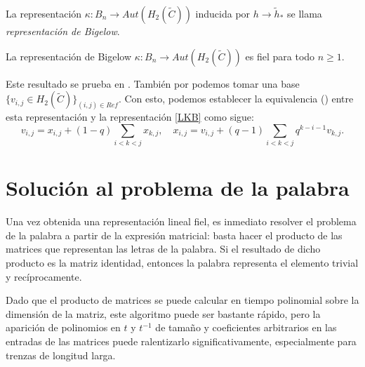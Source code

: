 \documentclass[TFG.tex]{subfiles}
\begin{document}
\begin{defi}
La representación $\kappa:B_n\to Aut(H_2(\widetilde{C}))$ inducida por $h\to\tilde{h}_*$ se llama \emph{representación de Bigelow}.
\end{defi}

\begin{teorema}
La representación de Bigelow $\kappa:B_n\to Aut(H_2(\widetilde{C}))$ es fiel para todo $n\geq 1$.
\end{teorema}

Este resultado se prueba en \cite{Bil}. También por \cite{Bil} podemos tomar una base $\{v_{i,j}\in H_2(\widetilde{C})\}_{(i,j)\in Ref}$. Con esto, podemos establecer la equivalencia (\cite{nundam}) entre esta representación y la representación  \ref{LKB} como sigue:
\[
v_{i,j}=x_{i,j}+(1-q)\sum_{i<k<j}x_{k,j},\quad x_{i,j}=v_{i,j}+(q-1)\sum_{i<k<j}q^{k-i-1}v_{k,j}.
\]


\section{Solución al problema de la palabra}
Una vez obtenida una representación lineal fiel, es inmediato resolver el problema de la palabra a partir de la expresión matricial: basta hacer el producto de las matrices que representan las letras de la palabra. Si el resultado de dicho producto es la matriz identidad, entonces la palabra representa el elemento trivial y recíprocamente.

Dado que el producto de matrices se puede calcular en tiempo polinomial sobre la dimensión de la matriz, este algoritmo puede ser bastante rápido, pero la aparición de polinomios en $t$ y $t^{-1}$ de tamaño y coeficientes arbitrarios en las entradas de las matrices puede ralentizarlo significativamente, especialmente para trenzas de longitud larga.
\end{document}
